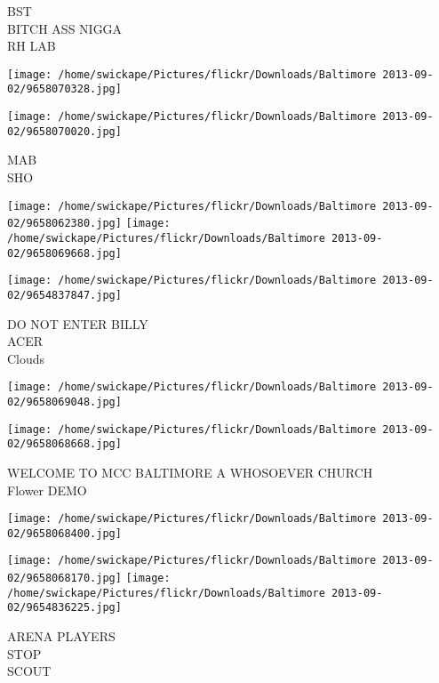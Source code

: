 \documentclass[10pt,letterpaper]{article}
\begin{document}
BST\\
BITCH ASS NIGGA\\
RH LAB\\
\pagebreak

\texttt{[image: /home/swickape/Pictures/flickr/Downloads/Baltimore 2013-09-02/9658070328.jpg]}

\vspace{0.25in}
\texttt{[image: /home/swickape/Pictures/flickr/Downloads/Baltimore 2013-09-02/9658070020.jpg]}

MAB\\
SHO\\
\pagebreak

\texttt{[image: /home/swickape/Pictures/flickr/Downloads/Baltimore 2013-09-02/9658062380.jpg]}
\texttt{[image: /home/swickape/Pictures/flickr/Downloads/Baltimore 2013-09-02/9658069668.jpg]}

\vspace{0.25in}
\texttt{[image: /home/swickape/Pictures/flickr/Downloads/Baltimore 2013-09-02/9654837847.jpg]}

DO NOT ENTER BILLY\\
ACER\\
Clouds\\
\pagebreak

\texttt{[image: /home/swickape/Pictures/flickr/Downloads/Baltimore 2013-09-02/9658069048.jpg]}

\vspace{0.25in}
\texttt{[image: /home/swickape/Pictures/flickr/Downloads/Baltimore 2013-09-02/9658068668.jpg]}

WELCOME TO MCC BALTIMORE A WHOSOEVER CHURCH\\
Flower DEMO\\
\pagebreak

\texttt{[image: /home/swickape/Pictures/flickr/Downloads/Baltimore 2013-09-02/9658068400.jpg]}

\vspace{0.25in}
\texttt{[image: /home/swickape/Pictures/flickr/Downloads/Baltimore 2013-09-02/9658068170.jpg]}
\texttt{[image: /home/swickape/Pictures/flickr/Downloads/Baltimore 2013-09-02/9654836225.jpg]}

ARENA PLAYERS\\
STOP\\
SCOUT\\
\pagebreak
\end{document}
